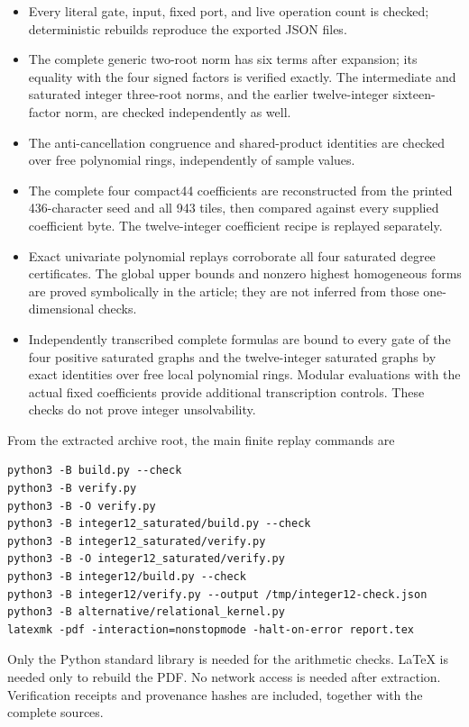 \documentclass[11pt,letterpaper]{article}
\theoremstyle{remark}\newtheorem{remark}[theorem]{Remark}
\begin{document}
\begin{itemize}
\item Every literal gate, input, fixed port, and live operation count is
      checked; deterministic rebuilds reproduce the exported JSON files.
\item The complete generic two-root norm has six terms after expansion;
      its equality with the four signed factors is verified exactly.
      The intermediate and saturated integer three-root norms, and the
      earlier twelve-integer sixteen-factor norm, are checked independently
      as well.
\item The anti-cancellation congruence and shared-product identities are
      checked over free polynomial rings, independently of sample values.
\item The complete four compact44 coefficients are reconstructed from
      the printed 436-character seed and all 943 tiles, then compared
      against every supplied coefficient byte.  The twelve-integer
      coefficient recipe is replayed separately.
\item Exact univariate polynomial replays corroborate all four saturated
      degree certificates.  The global upper bounds and nonzero highest
      homogeneous forms are proved symbolically in the article; they
      are not inferred from those one-dimensional checks.
\item Independently transcribed complete formulas are bound to every
      gate of the four positive saturated graphs and the twelve-integer
      saturated graphs by exact identities over free local polynomial
      rings.  Modular evaluations with the actual fixed coefficients
      provide additional transcription controls.  These checks do not
      prove integer unsolvability.
\end{itemize}

From the extracted archive root, the main finite replay commands are
\begin{verbatim}
python3 -B build.py --check
python3 -B verify.py
python3 -B -O verify.py
python3 -B integer12_saturated/build.py --check
python3 -B integer12_saturated/verify.py
python3 -B -O integer12_saturated/verify.py
python3 -B integer12/build.py --check
python3 -B integer12/verify.py --output /tmp/integer12-check.json
python3 -B alternative/relational_kernel.py
latexmk -pdf -interaction=nonstopmode -halt-on-error report.tex
\end{verbatim}
Only the Python standard library is needed for the arithmetic checks.
LaTeX is needed only to rebuild the PDF.  No network access is needed
after extraction.  Verification receipts and provenance hashes are
included, together with the complete sources.
\end{document}
